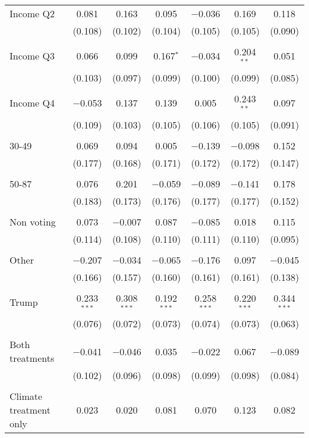 \begin{tabular}{@{\extracolsep{5pt}}lcccccc}
 Income Q2 & 0.081 & 0.163 & 0.095 & $-$0.036 & 0.169 & 0.118 \\ 
  & (0.108) & (0.102) & (0.104) & (0.105) & (0.105) & (0.090) \\ 
  & & & & & & \\ 
 Income Q3 & 0.066 & 0.099 & 0.167$^{*}$ & $-$0.034 & 0.204$^{**}$ & 0.051 \\ 
  & (0.103) & (0.097) & (0.099) & (0.100) & (0.099) & (0.085) \\ 
  & & & & & & \\ 
 Income Q4 & $-$0.053 & 0.137 & 0.139 & 0.005 & 0.243$^{**}$ & 0.097 \\ 
  & (0.109) & (0.103) & (0.105) & (0.106) & (0.105) & (0.091) \\ 
  & & & & & & \\ 
 30-49 & 0.069 & 0.094 & 0.005 & $-$0.139 & $-$0.098 & 0.152 \\ 
  & (0.177) & (0.168) & (0.171) & (0.172) & (0.172) & (0.147) \\ 
  & & & & & & \\ 
 50-87 & 0.076 & 0.201 & $-$0.059 & $-$0.089 & $-$0.141 & 0.178 \\ 
  & (0.183) & (0.173) & (0.176) & (0.177) & (0.177) & (0.152) \\ 
  & & & & & & \\ 
 Non voting & 0.073 & $-$0.007 & 0.087 & $-$0.085 & 0.018 & 0.115 \\ 
  & (0.114) & (0.108) & (0.110) & (0.111) & (0.110) & (0.095) \\ 
  & & & & & & \\ 
 Other & $-$0.207 & $-$0.034 & $-$0.065 & $-$0.176 & 0.097 & $-$0.045 \\ 
  & (0.166) & (0.157) & (0.160) & (0.161) & (0.161) & (0.138) \\ 
  & & & & & & \\ 
 Trump & 0.233$^{***}$ & 0.308$^{***}$ & 0.192$^{***}$ & 0.258$^{***}$ & 0.220$^{***}$ & 0.344$^{***}$ \\ 
  & (0.076) & (0.072) & (0.073) & (0.074) & (0.073) & (0.063) \\ 
  & & & & & & \\ 
 Both treatments & $-$0.041 & $-$0.046 & 0.035 & $-$0.022 & 0.067 & $-$0.089 \\ 
  & (0.102) & (0.096) & (0.098) & (0.099) & (0.098) & (0.084) \\ 
  & & & & & & \\ 
 Climate treatment only & 0.023 & 0.020 & 0.081 & 0.070 & 0.123 & 0.082 \\ 

\end{tabular}
